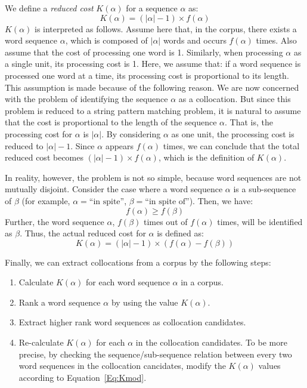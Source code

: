 We define a {\em reduced cost} $K(\alpha)$ for a sequence $\alpha$ as:
\begin{equation}
        K(\alpha) = (|\alpha| - 1) \times f(\alpha)
\end{equation}
$K(\alpha)$ is interpreted as follows.
Assume here that, in the corpus, there exists a word sequence $\alpha$,
which is composed of $|\alpha|$ words and occurs $f(\alpha)$ times.
Also assume that the cost of processing one word is 1.
Similarly, when processing $\alpha$ as a single unit,
its processing cost is 1.
Here, we assume that:
if a word sequence is processed one word at a time,
its processing cost is proportional to its length.
This assumption is made because of the following reason.
We are now concerned with the problem of identifying the sequence $\alpha$
as a collocation.
But since this problem is reduced to a string pattern matching problem,
it is natural to assume that
the cost is proportional to the length of the sequence $\alpha$.
That is, the processing cost for $\alpha$ is $|\alpha|$.
By considering $\alpha$ as one unit, the processing cost is reduced
to $|\alpha|-1$.
Since $\alpha$ appears $f(\alpha)$ times,
we can conclude that the total reduced cost becomes
$(|\alpha| - 1) \times f(\alpha)$, which is the definition of $K(\alpha)$.

In reality, however, the problem is not so simple,
because word sequences are not mutually disjoint.
Consider the case where a word sequence $\alpha$ is a sub-sequence of $\beta$
(for example, $\alpha = \mbox{``in spite''}$, $\beta = \mbox{``in spite of''}$).
Then, we have:
\begin{equation}
        f(\alpha) \geq f(\beta)
\end{equation}
Further, the word sequence $\alpha$,
$f(\beta)$ times out of $f(\alpha)$ times, will be identified as $\beta$.
Thus, the actual reduced cost for $\alpha$ is defined as:
\begin{equation}
        K(\alpha) = (|\alpha| - 1) \times (f(\alpha) - f(\beta))
\label{Eq:Kmod}
\end{equation}

Finally, we can extract collocations from a corpus by the following steps:
\begin{enumerate}
\item   Calculate $K(\alpha)$ for each word sequence $\alpha$ in a corpus.
\item   Rank a word sequence $\alpha$ by using the value $K(\alpha)$.
\item   Extract higher rank word sequences as collocation candidates.
\item   Re-calculate $K(\alpha)$ for each $\alpha$ in the collocation candidates.
To be more precise,
by checking the sequence/sub-sequence relation
between every two word sequences in the collocation cancidates,
modify the $K(\alpha)$ values according to Equation~\ref{Eq:Kmod}.
\end{enumerate}


